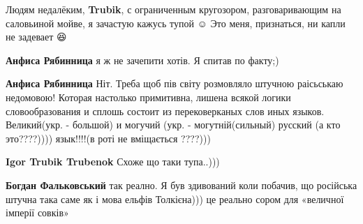 \begin{itemize}
\begin{itemize}
\begin{itemize}
Людям недалёким, \textbf{Trubik}, с ограниченным кругозором, разговаривающим на саловьиной мойве, я зачастую кажусь тупой ☺️
Это меня, признаться, ни капли не задевает 😆

 
\textbf{Анфиса Рябинница} я ж не зачепити хотів. Я спитав по факту;)

 
\textbf{Анфиса Рябинница}
Ніт.
Треба щоб пів світу розмовляло штучною раісьськаю недомовою!
Которая настолько примитивна, лишена всякой логики словообразования и сплошь состоит из перековерканых слов иных языков.
Великий(укр. - большой) и могучий (укр. - могутній(сильный) русский (а кто это????)))) язык!!!!(в роті не вміщається ????)))

 
\textbf{Igor Trubik Trubenok}
Схоже що таки тупа..)))

 
\textbf{Богдан Фальковський} так реално. Я був здивований коли побачив, що російська штучна така саме як і мова ельфів Толкієна))) це реально сором для «величної імперії совків»

\end{itemize}

 

\end{itemize}
\end{itemize}
